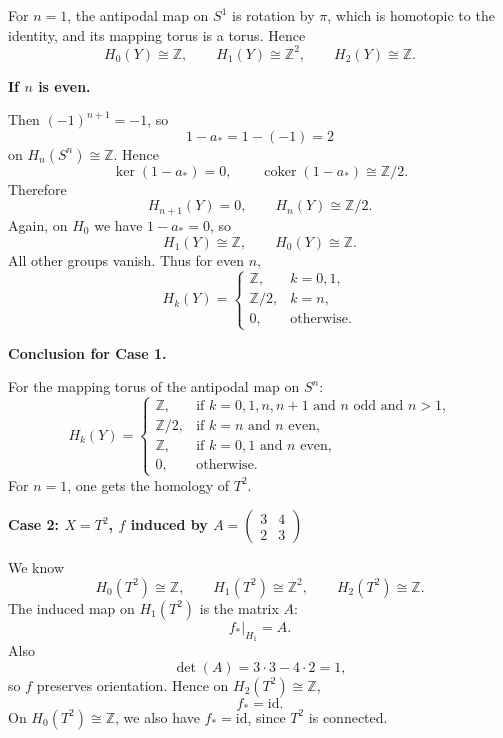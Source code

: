 \begin{solution}
For \(n=1\), the antipodal map on \(S^1\) is rotation by \(\pi\), which is homotopic to the identity, and its mapping torus is a torus. Hence
\[
H_0(Y)\cong \mathbb Z,\qquad
H_1(Y)\cong \mathbb Z^2,\qquad
H_2(Y)\cong \mathbb Z.
\]


\medskip
\noindent\textbf{If \(n\) is even.}\par
\smallskip

Then \((-1)^{n+1}=-1\), so
\[
1-a_*=1-(-1)=2
\]
on \(H_n(S^n)\cong \mathbb Z\). Hence
\[
\ker(1-a_*)=0,\qquad \operatorname{coker}(1-a_*)\cong \mathbb Z/2.
\]
Therefore
\[
H_{n+1}(Y)=0,\qquad H_n(Y)\cong \mathbb Z/2.
\]
Again, on \(H_0\) we have \(1-a_*=0\), so
\[
H_1(Y)\cong \mathbb Z,\qquad H_0(Y)\cong \mathbb Z.
\]
All other groups vanish. Thus for even \(n\),
\[
H_k(Y)=
\begin{cases}
	\mathbb Z, & k=0,1,\\
	\mathbb Z/2, & k=n,\\
	0, & \text{otherwise}.
\end{cases}
\]


\medskip
\noindent\textbf{Conclusion for Case 1.}\par
\smallskip

For the mapping torus of the antipodal map on \(S^n\):
\[
H_k(Y)=
\begin{cases}
	\mathbb Z, & \text{if $k=0,1,n,n+1$ and $n$ odd and $n>1$,}\\
	\mathbb Z/2, & \text{if $k=n$ and $n$ even,}\\
	\mathbb Z, & \text{if $k=0,1$ and $n$ even,}\\
	0, & \text{otherwise.}
\end{cases}
\]
For \(n=1\), one gets the homology of \(T^2\).


\medskip
\noindent\textbf{Case 2: \(X=T^2\), \(f\) induced by \(A=\begin{pmatrix}3&4\\2&3\end{pmatrix}\)}\par
\smallskip


We know
\[
H_0(T^2)\cong \mathbb Z,\qquad
H_1(T^2)\cong \mathbb Z^2,\qquad
H_2(T^2)\cong \mathbb Z.
\]
The induced map on \(H_1(T^2)\) is the matrix \(A\):
\[
f_*|_{H_1}=A.
\]
Also
\[
\det(A)=3\cdot 3-4\cdot 2=1,
\]
so \(f\) preserves orientation. Hence on \(H_2(T^2)\cong \mathbb Z\),
\[
f_*=\mathrm{id}.
\]
On \(H_0(T^2)\cong \mathbb Z\), we also have \(f_*=\mathrm{id}\), since \(T^2\) is connected.


\end{solution}
